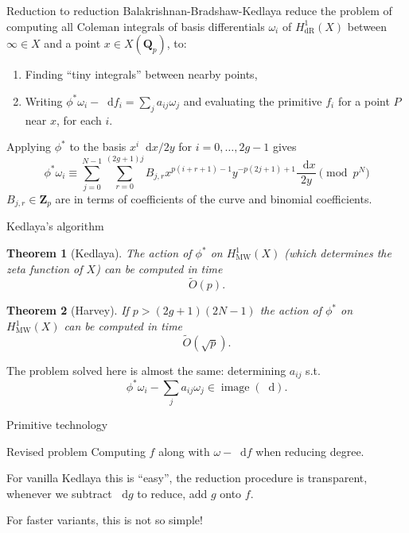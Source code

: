 \documentclass[notheorems]{beamer}
\theoremstyle{plain}
\newtheorem{theorem}{Theorem}[section]
\theoremstyle{definition}
\theoremstyle{definition}
\theoremstyle{definition}
\newcommand{\diff}{\mathop{}\!\mathrm{d}}
\newcommand{\ZZ}{\mathbf{Z}}
\newcommand{\QQ}{\mathbf{Q}}
\newcommand{\gt}{>}
\begin{document}
\begin{frame}{Reduction to reduction}
    Balakrishnan-Bradshaw-Kedlaya reduce the problem of computing all Coleman integrals of basis differentials \(\omega_i\) of \(H^1_{\mathrm{dR}}(X)\) between \(\infty\in X\) and a point \(x\in X(\QQ_p)\), to:
    \begin{enumerate}
        \item Finding ``tiny integrals'' between nearby points,
        \item Writing \(\phi^*\omega_i  - \diff f_i=\sum_j a_{ij}\omega_j \) and evaluating the primitive \(f_i\) for a point \(P\) near \(x\), for each \(i\).
    \end{enumerate}
    \pause%
    Applying \(\phi^*\) to the basis \(x^i \diff x/2y\) for \(i = 0,\ldots, 2g-1\) gives
    \[\phi^* \omega_i \equiv\sum_{j=0}^{N-1} \sum_{r=0}^{(2g+1)j} B_{j,r} x^{p(i+r+1) - 1}y^{-p(2j+1) + 1} \frac{\diff x}{2y}\pmod{p^N}\]
    \(B_{j,r}\in \ZZ_p\) are in terms of coefficients of the curve and binomial coefficients.

\end{frame}

\begin{frame}{Kedlaya's algorithm}
    \begin{theorem}[Kedlaya]
        The action of \(\phi^*\) on \(H^1_{\mathrm{MW}}(X)\) (which determines the zeta function of \(X\)) can be computed in time
        \[
            \widetilde O(p)\text{.}
        \]
    \end{theorem}

    \pause%

    \begin{theorem}[Harvey]
        If \(p \gt (2g+1)(2N-1)\) the action of \(\phi^*\) on \(H^1_{\mathrm{MW}}(X)\) can be computed in time
        \[
            \widetilde O(\sqrt{p})\text{.}
        \]
    \end{theorem}

    \pause%

    The problem solved here is almost the same: determining \(a_{ij}\) s.t. \[\phi^* \omega_i -  \sum_j a_{ij}\omega_j \in \operatorname{image} (\diff)\text{.}\]
\end{frame}


\begin{frame}{Primitive technology}
    \begin{block}{Revised problem}
        Computing \(f\) along with \(\omega - \diff f\) when reducing degree.
    \end{block}

    For vanilla Kedlaya this is ``easy'', the reduction procedure is transparent, whenever we subtract \(\diff g\) to reduce, add \(g\) onto \(f\).

    For faster variants, this is not so simple!
\end{frame}
\end{document}
